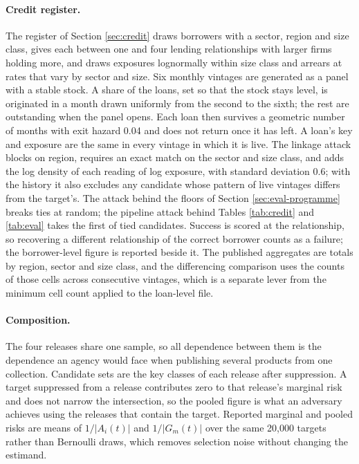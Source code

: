 \documentclass[11pt,a4paper]{article}
\theoremstyle{plain}
\theoremstyle{definition}
\theoremstyle{definition}
\theoremstyle{plain}
\begin{document}
\paragraph{Credit register.} The register of Section \ref{sec:credit} draws
borrowers with a sector, region and size class, gives each between one and four
lending relationships with larger firms holding more, and draws exposures
lognormally within size class and arrears at rates that vary by sector and size.
Six monthly vintages are generated as a panel with a stable stock. A share of
the loans, set so that the stock stays level, is originated in a month drawn
uniformly from the second to the sixth; the rest are outstanding when the panel
opens. Each loan then survives a geometric number of months with exit hazard 0.04
and does not return once it has left. A loan's key and exposure are the same in
every vintage in which it is live. The linkage attack blocks on region, requires
an exact match on the sector and size class, and adds the log density of each
reading of log exposure, with standard deviation 0.6; with the history it also
excludes any candidate whose pattern of live vintages differs from the target's.
The attack behind the floors of Section \ref{sec:eval-programme} breaks ties at
random; the pipeline attack behind Tables \ref{tab:credit} and \ref{tab:eval}
takes the first of tied candidates. Success is scored at the relationship, so
recovering a different relationship of the correct borrower counts as a failure;
the borrower-level figure is reported beside it. The published aggregates are totals by
region, sector and size class, and the differencing comparison uses the counts of
those cells across consecutive vintages, which is a separate lever from the
minimum cell count applied to the loan-level file.

\paragraph{Composition.} The four releases share one sample, so all dependence
between them is the dependence an agency would face when publishing several
products from one collection. Candidate sets are the key classes of each
release after suppression. A target suppressed from a release contributes zero
to that release's marginal risk and does not narrow the intersection, so the
pooled figure is what an adversary achieves using the releases that contain the
target. Reported marginal and pooled risks are means of $1/|A_i(t)|$ and
$1/|G_m(t)|$ over the same 20,000 targets rather than Bernoulli draws, which
removes selection noise without changing the estimand.
\end{document}

